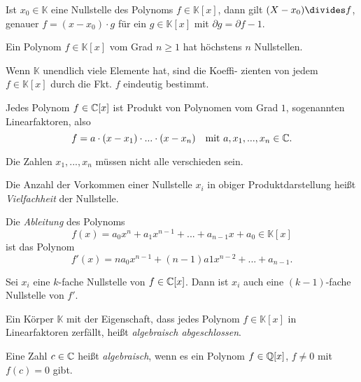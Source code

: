 \documentclass{cheat-sheet}
\newcommand{\K}{\mathbb{K}} %
\begin{document}
\begin{satz}
  Ist $x_0 \in \K$ eine Nullstelle des Polynoms $f \in \K[x]$, dann gilt $(X - x_0) \divides f$, genauer $f = (x{-}x_0) \cdot g$ für ein $g {\in} \K[x]$ mit $\partial g = \partial f {-} 1$.
\end{satz}

\begin{kor}
  Ein Polynom $f \in \K[x]$ vom Grad $n \geq 1$ hat höchstens $n$ Nullstellen.
\end{kor}

\begin{kor}
  Wenn $\K$ unendlich viele Elemente hat, sind die Koeffi- zienten von jedem $f \in \K[x]$ durch die Fkt. $f$ eindeutig bestimmt.
\end{kor}

\begin{satz}
  Jedes Polynom $f \in \mathbb{C}[x]$ ist Produkt von Polynomen vom Grad $1$, sogenannten Linearfaktoren, also
  \[
    f = a \cdot (x - x_1) \cdot ... \cdot (x - x_n)
    \quad \text{mit $a, x_1, ..., x_n \in \mathbb{C}$}.
  \]
\end{satz}

\begin{bem}
  Die Zahlen $x_1, ..., x_n$ müssen nicht alle verschieden sein.
\end{bem}

\begin{defn}
  Die Anzahl der Vorkommen einer Nullstelle $x_i$ in obiger Produktdarstellung heißt \emph{Vielfachheit} der Nullstelle.
\end{defn}

\begin{defn}
  Die \emph{Ableitung} des Polynoms
  \[ f(x) = a_0 x^n + a_1 x^{n-1} + ... + a_{n-1} x + a_0 \in \K[x] \]
  ist das Polynom
  \[ f'(x) = n a_0 x^{n-1} + (n{-}1) a1 x^{n-2} + ... + a_{n-1}. \]
\end{defn}

\begin{bem}
  Sei $x_i$ eine $k$-fache Nullstelle von $f \in \mathbb{C}[x]$. Dann ist $x_i$ auch eine $(k{-}1)$-fache Nullstelle von $f'$.
\end{bem}

\begin{defn}
  Ein Körper $\K$ mit der Eigenschaft, dass jedes Polynom $f \in \K[x]$ in Linearfaktoren zerfällt, heißt \emph{algebraisch abgeschlossen}.
\end{defn}

\begin{defn}
  Eine Zahl $c \in \mathbb{C}$ heißt \emph{algebraisch}, wenn es ein Polynom $f \in \mathbb{Q}[x]$, $f \not= 0$ mit $f(c) = 0$ gibt.
\end{defn}
\end{document}
